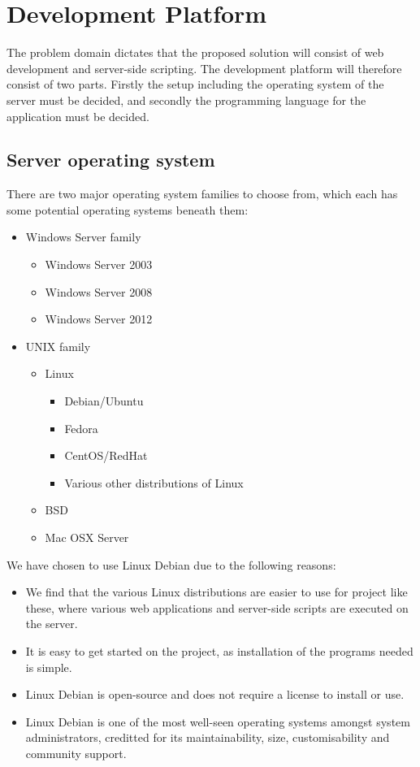 \section{Development Platform}
The problem domain dictates that the proposed solution will consist of web development and server-side scripting.
The development platform will therefore consist of two parts.
Firstly the setup including the operating system of the server must be decided, and secondly the programming language for the application must be decided.

\subsection{Server operating system}
There are two major operating system families to choose from, which each has some potential operating systems beneath them:

\begin{itemize}
	\item Windows Server family
		\begin{itemize}
			\item Windows Server 2003
			\item Windows Server 2008
			\item Windows Server 2012
		\end{itemize}
	\item UNIX family
		\begin{itemize}
			\item Linux
				\begin{itemize}
					\item Debian/Ubuntu
					\item Fedora
					\item CentOS/RedHat
					\item Various other distributions of Linux
				\end{itemize}
			\item BSD
			\item Mac OSX Server
		\end{itemize}
\end{itemize}

We have chosen to use Linux Debian due to the following reasons:

\begin{itemize}
	\item We find that the various Linux distributions are easier to use for project like these, where various web applications and server-side scripts are executed on the server. 
	\item It is easy to get started on the project, as installation of the programs needed is simple.
	\item Linux Debian is open-source and does not require a license to install or use. 
	\item Linux Debian is one of the most well-seen operating systems amongst system administrators, creditted for its maintainability, size, customisability and community support.\citep{why_debian}
\end{itemize}

